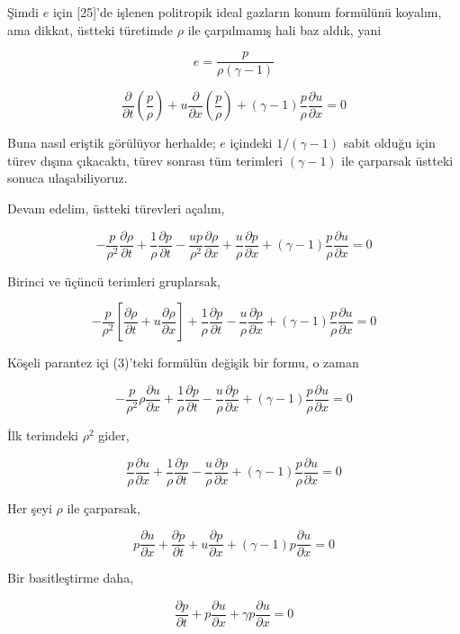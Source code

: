 \documentclass[12pt,fleqn]{article}\usepackage{../../common}
\begin{document}
Şimdi $e$ için [25]'de işlenen politropik ideal gazların konum formülünü koyalım,
ama dikkat, üstteki türetimde $\rho$ ile çarpılmamış hali baz aldık, yani

$$
e = \frac{p}{\rho (\gamma - 1)}
$$

$$
\frac{\partial }{\partial t} \left(\frac{p}{\rho}\right) +
u \frac{\partial }{\partial x} \left(\frac{p}{\rho} \right) +
(\gamma - 1)\frac{p}{\rho} \frac{\partial u}{\partial x} = 0
$$

Buna nasıl eriştik görülüyor herhalde; $e$ içindeki $1/(\gamma-1)$ sabit
olduğu için türev dışına çıkacaktı, türev sonrası tüm terimleri $(\gamma-1)$
ile çarparsak üstteki sonuca ulaşabiliyoruz.

Devam edelim, üstteki türevleri açalım,

$$
-\frac{p}{\rho^2} \frac{\partial \rho}{\partial t} +
\frac{1}{\rho} \frac{\partial p}{\partial t} -
\frac{up}{\rho^2} \frac{\partial \rho}{\partial x} +
\frac{u}{\rho} \frac{\partial p}{\partial x} +
(\gamma - 1)\frac{p}{\rho} \frac{\partial u}{\partial x} = 0
$$

Birinci ve üçüncü terimleri gruplarsak,

$$
-\frac{p}{\rho^2}
\left[
  \frac{\partial \rho}{\partial t} + u \frac{\partial \rho}{\partial x}
\right] +
\frac{1}{\rho} \frac{\partial p}{\partial t} -
\frac{u}{\rho} \frac{\partial p}{\partial x} +
(\gamma - 1)\frac{p}{\rho} \frac{\partial u}{\partial x} = 0
$$

Köşeli parantez içi (3)'teki formülün değişik bir formu, o zaman

$$
-\frac{p}{\rho^2} \rho \frac{\partial u}{\partial x} +
\frac{1}{\rho} \frac{\partial p}{\partial t} -
\frac{u}{\rho} \frac{\partial p}{\partial x} +
(\gamma - 1)\frac{p}{\rho} \frac{\partial u}{\partial x} = 0
$$

İlk terimdeki $\rho^2$ gider,

$$
\frac{p}{\rho} \frac{\partial u}{\partial x} +
\frac{1}{\rho} \frac{\partial p}{\partial t} -
\frac{u}{\rho} \frac{\partial p}{\partial x} +
(\gamma - 1)\frac{p}{\rho} \frac{\partial u}{\partial x} = 0
$$

Her şeyi $\rho$ ile çarparsak,

$$
p \frac{\partial u}{\partial x} +
\frac{\partial p}{\partial t} +
u \frac{\partial p}{\partial x} +
(\gamma - 1)p \frac{\partial u}{\partial x} = 0
$$

Bir basitleştirme daha,

$$
\frac{\partial p}{\partial t} +
p \frac{\partial u}{\partial x} +
\gamma p \frac{\partial u}{\partial x} = 0
$$
\end{document}

